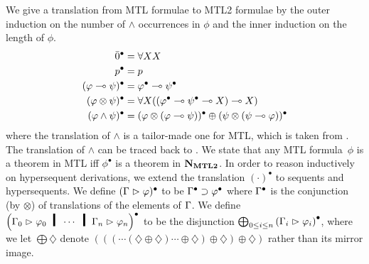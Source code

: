 We give a translation from MTL formulae to MTL2 formulae by the outer
induction on the number of $\wedge$ occurrences in $\phi$
and the inner induction on the
length of $\phi$.
\begin{align}
 \bar{0}^\bullet &= \forall XX \nonumber\\
 p^\bullet &= p \nonumber\\
 (\varphi\multimap\psi)^\bullet &= \varphi^\bullet \multimap \psi^\bullet\nonumber\\
 (\varphi\otimes\psi)^\bullet & = \forall
 X((\varphi^\bullet\multimap\psi^\bullet\multimap X)\multimap X) \nonumber\\
 (\varphi\land \psi)^\bullet &=
 (\varphi\otimes(\varphi\multimap\psi))^\bullet\oplus
 (\psi\otimes(\psi\multimap\varphi))^\bullet \label{eq:abb}
\end{align}
where the translation of $\wedge$ is a tailor-made one for MTL,
 which is taken from \citep[p.~48]{handbook:fuzzy}.  The translation of $\wedge$
can be traced back to \citet[Lemma~6.5]{Cintula200740}.
We state that any MTL formula~$\phi$ is a theorem in MTL iff
 $\phi^\bullet$ is a theorem in $\mathbf{N}_{\mathbf{MTL2}}$.
 In order to reason inductively on hypersequent derivations, we extend
 the translation $(\cdot)^\bullet$ to sequents and hypersequents.
 We define $(\Gamma\vartriangleright\varphi)^\bullet$ to be $\Gamma^\bullet\supset\varphi^\bullet$
 where
 $\Gamma^\bullet$ is the conjunction (by $\otimes$) of translations of the
 elements of $\Gamma$.
 We define
 $\left(\G_0\tr\phi_0\hmid\cdots\hmid\G_n\tr\phi_n\right)^\bullet$ to be
 the disjunction $\bigoplus_{0\le i\le n}\left(\Gamma_i\vartriangleright
 \varphi_i\right)^\bullet$, where we let $\bigoplus\diamondsuit$ denote
 $(((\cdots(\diamondsuit\oplus\diamondsuit)\cdots\oplus\diamondsuit)\oplus\diamondsuit)\oplus\diamondsuit)$
 rather than its mirror image.


